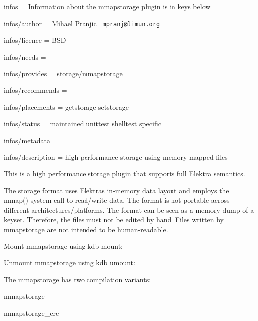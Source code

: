 
\begin{DoxyItemize}
\item infos = Information about the mmapstorage plugin is in keys below
\item infos/author = Mihael Pranjic \href{mailto:mpranj@limun.org}{\texttt{ mpranj@limun.\+org}}
\item infos/licence = B\+SD
\item infos/needs =
\item infos/provides = storage/mmapstorage
\item infos/recommends =
\item infos/placements = getstorage setstorage
\item infos/status = maintained unittest shelltest specific
\item infos/metadata =
\item infos/description = high performance storage using memory mapped files
\end{DoxyItemize}

This is a high performance storage plugin that supports full Elektra semantics.

The storage format uses Elektra\textquotesingle{}s in-\/memory data layout and employs the {\ttfamily mmap()} system call to read/write data. The format is not portable across different architectures/platforms. The format can be seen as a memory dump of a keyset. Therefore, the files must not be edited by hand. Files written by mmapstorage are not intended to be human-\/readable.

Mount mmapstorage using {\ttfamily kdb mount}\+:


\begin{DoxyCode}{0}
\end{DoxyCode}


Unmount mmapstorage using {\ttfamily kdb umount}\+:


\begin{DoxyCode}{0}
\end{DoxyCode}


The mmapstorage has two compilation variants\+:


\begin{DoxyEnumerate}
\item mmapstorage
\item mmapstorage\+\_\+crc
\end{DoxyEnumerate}

